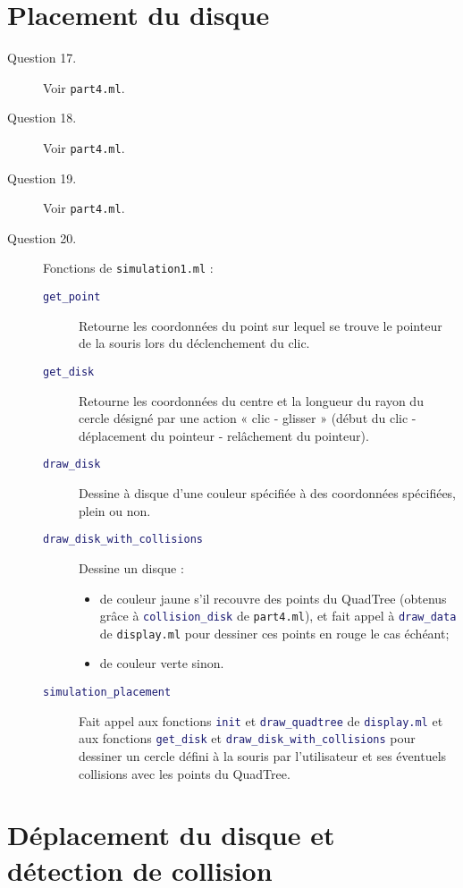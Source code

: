 \documentclass[11pt]{scrartcl}
\newcommand{\functionname}[1]{\texttt{\textcolor{MidnightBlue}{#1}}}
\newcommand{\filename}[1]{\texttt{\textcolor{RawSienna}{#1}}}
\begin{document}
\section{Placement du disque}

\begin{description}
\item[Question 17.] Voir \filename{part4.ml}.

\item[Question 18.] Voir \filename{part4.ml}.

\item[Question 19.] Voir \filename{part4.ml}.

\item[Question 20.] Fonctions de \filename{simulation1.ml} :
\begin{description}
\item[\functionname{get_point}] Retourne les coordonnées du point sur lequel se trouve le pointeur de la souris lors du déclenchement du clic.
\item[\functionname{get_disk}] Retourne les coordonnées du centre et la longueur du rayon du cercle désigné par une action « clic - glisser » (début du clic - déplacement du pointeur - relâchement du pointeur).
\item[\functionname{draw_disk}] Dessine à disque d'une couleur spécifiée à des coordonnées spécifiées, plein ou non.
\item[\functionname{draw_disk_with_collisions}] Dessine un disque :
\begin{itemize}
\item de couleur jaune s'il recouvre des points du QuadTree (obtenus grâce à \functionname{collision_disk} de \filename{part4.ml}), et fait appel à \functionname{draw_data} de \filename{display.ml} pour dessiner ces points en rouge le cas échéant;
\item de couleur verte sinon.
\end{itemize}
\item[\functionname{simulation_placement}] Fait appel aux fonctions \functionname{init} et \functionname{draw_quadtree} de \functionname{display.ml} et aux fonctions \functionname{get_disk} et \functionname{draw_disk_with_collisions} pour dessiner un cercle défini à la souris par l'utilisateur et ses éventuels collisions avec les points du QuadTree.
\end{description}
\end{description}

\section{Déplacement du disque et détection de collision}
\end{document}
